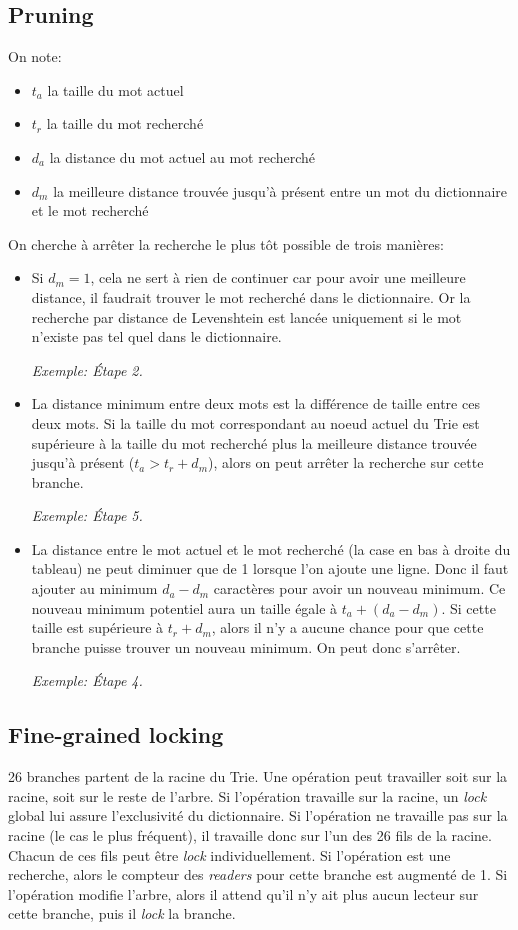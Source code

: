 \documentclass{article}
\begin{document}
\subsection{Pruning}
On note:
\begin{itemize}
\item $t_a$ la taille du mot actuel
\item $t_r$ la taille du mot recherché
\item $d_a$ la distance du mot actuel au mot recherché
\item $d_m$ la meilleure distance trouvée jusqu'à présent entre un mot
  du dictionnaire et le mot recherché
\end{itemize}
On cherche à arrêter la recherche le plus tôt possible de trois
manières:
\begin{itemize}
\item Si $d_m = 1$, cela ne sert à rien de continuer car pour avoir une
  meilleure distance, il faudrait trouver le mot recherché dans le
  dictionnaire. Or la recherche par distance de Levenshtein est lancée
  uniquement si le mot n'existe pas tel quel dans le dictionnaire.

\textit{Exemple: Étape 2.}

\item La distance minimum entre deux mots est la différence de taille
  entre ces deux mots.
Si la taille du mot correspondant au noeud actuel du Trie est supérieure
à la taille du mot recherché plus la meilleure distance trouvée
jusqu'à présent ($t_a > t_r + d_m$), alors on peut arrêter la
recherche sur cette branche.

\textit{Exemple: Étape 5.}

\item La distance entre le mot actuel et le mot recherché (la case en
  bas à droite du tableau) ne peut diminuer que de 1 lorsque l'on ajoute
  une ligne.
Donc il faut ajouter au minimum $d_a - d_m$ caractères pour avoir un
nouveau minimum.
Ce nouveau minimum potentiel aura un taille égale à $t_a + (d_a - d_m)$.
Si cette taille est supérieure à $t_r + d_m$, alors il n'y a aucune
chance pour que cette branche puisse trouver un nouveau minimum.
On peut donc s'arrêter.

\textit{Exemple: Étape 4.}
\end{itemize}

\subsection{Fine-grained locking}
26 branches partent de la racine du Trie.
Une opération peut travailler soit sur la racine, soit sur le reste de
l'arbre.
Si l'opération travaille sur la racine, un \textit{lock} global lui
assure l'exclusivité du dictionnaire.
Si l'opération ne travaille pas sur la racine (le cas le plus fréquent),
il travaille donc sur l'un des 26 fils de la racine.
Chacun de ces fils peut être \textit{lock} individuellement.
Si l'opération est une recherche, alors le compteur des \textit{readers}
pour cette branche est augmenté de 1.
Si l'opération modifie l'arbre, alors il attend qu'il n'y ait plus aucun
lecteur sur cette branche, puis il \textit{lock} la branche.
\end{document}
